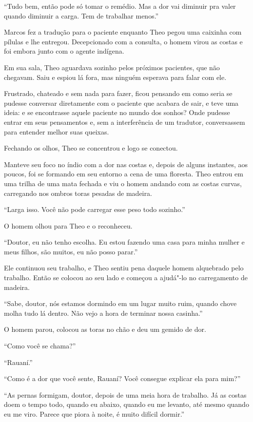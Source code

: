 ``Tudo bem, então pode só tomar o remédio. Mas a dor vai diminuir pra
valer quando diminuir a carga. Tem de trabalhar menos.''

Marcos fez a tradução para o paciente enquanto Theo pegou uma caixinha
com pílulas e lhe entregou. Decepcionado com a consulta, o homem virou
as costas e foi embora junto com o agente indígena.

Em sua sala, Theo aguardava sozinho pelos próximos pacientes, que
não chegavam. Saiu e espiou lá fora, mas ninguém esperava para
falar com ele.

Frustrado, chateado e sem nada para fazer, ficou pensando em como seria
se pudesse conversar diretamente com o paciente que acabara de sair, e
teve uma ideia: e se encontrasse aquele paciente no mundo dos sonhos? Onde
pudesse entrar em seus pensamentos e, sem a interferência de um
tradutor, conversassem para entender melhor suas queixas.

Fechando os olhos, Theo se concentrou e logo se conectou.

Manteve seu foco no índio com a dor nas costas e, depois de alguns
instantes, aos poucos, foi se formando em seu entorno a cena de uma
floresta. Theo entrou em uma trilha de uma mata fechada e viu o homem
andando com as costas curvas, carregando nos ombros toras pesadas de
madeira.

``Larga isso. Você não pode carregar esse peso todo sozinho.''

O homem olhou para Theo e o reconheceu.

``Doutor, eu não tenho escolha. Eu estou fazendo uma casa para minha
mulher e meus filhos, são muitos, eu não posso parar.''

Ele continuou seu trabalho, e Theo sentiu pena daquele homem alquebrado
pelo trabalho. Então se colocou ao seu lado e começou a ajudá"-lo no
carregamento de madeira.

``Sabe, doutor, nós estamos dormindo em um lugar muito ruim, quando
chove molha tudo lá dentro. Não vejo a hora de terminar nossa casinha.''

O homem parou, colocou as toras no chão e deu um gemido de dor.

``Como você se chama?''

``Rauaní.''

``Como é a dor que você sente, Rauaní? Você consegue explicar ela para
mim?''

``As pernas formigam, doutor, depois de uma meia hora de trabalho. Já as
costas doem o tempo todo, quando eu abaixo, quando eu me levanto, até
mesmo quando eu me viro. Parece que piora à noite, é muito difícil
dormir.''

